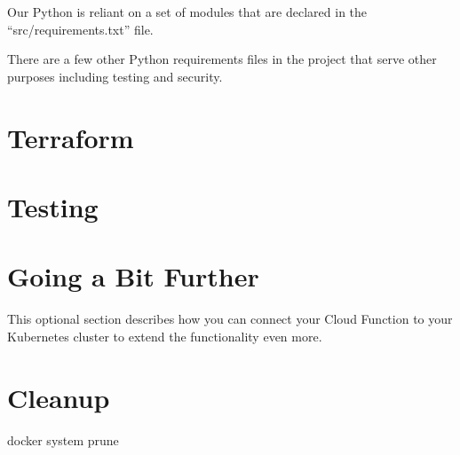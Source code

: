 \justifying
Our Python is reliant on a set of modules that are declared in the ``src/requirements.txt'' file.


\justifying
There are a few other Python requirements files in the project that serve other purposes including testing and security.


\section{\label{sec:tf}Terraform}

\section{\label{sec:test}Testing}

\section{\label{sec:next}Going a Bit Further}

\justifying
This optional section describes how you can connect your Cloud Function to your Kubernetes cluster to extend the functionality even more.

\section{\label{sec:cleanup}Cleanup}

\justifying

docker system prune


\clearpage
\begin{versionhistory}
\end{versionhistory}

\clearpage




